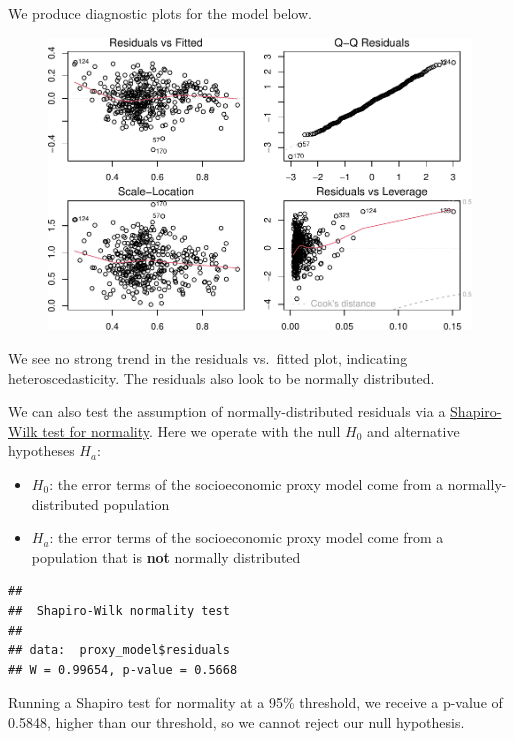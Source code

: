 \documentclass[
  man,floatsintext]{apa6}
\providecommand{\tightlist}{%
  \setlength{\itemsep}{0pt}\setlength{\parskip}{0pt}}
\begin{document}
We produce diagnostic plots for the model below.

\begin{figure}[H]
\includegraphics[width=\textwidth]{final-project_files/figure-latex/plot-proxy-model-1} \caption{ }\label{fig:plot-proxy-model}
\end{figure}

We see no strong trend in the residuals vs.~fitted plot, indicating heteroscedasticity. The residuals also look to be normally distributed.

We can also test the assumption of normally-distributed residuals via a \href{https://en.wikipedia.org/wiki/Shapiro–Wilk_test}{Shapiro-Wilk test for normality}. Here we operate with the null \(H_0\) and alternative hypotheses \(H_a\):

\begin{itemize}
\tightlist
\item
  \(H_0\): the error terms of the socioeconomic proxy model come from a normally-distributed population
\item
  \(H_a\): the error terms of the socioeconomic proxy model come from a population that is \textbf{not} normally distributed
\end{itemize}

\begin{verbatim}
## 
##  Shapiro-Wilk normality test
## 
## data:  proxy_model$residuals
## W = 0.99654, p-value = 0.5668
\end{verbatim}

Running a Shapiro test for normality at a 95\% threshold, we receive a p-value of 0.5848, higher than our threshold, so we cannot reject our null hypothesis.
\end{document}
